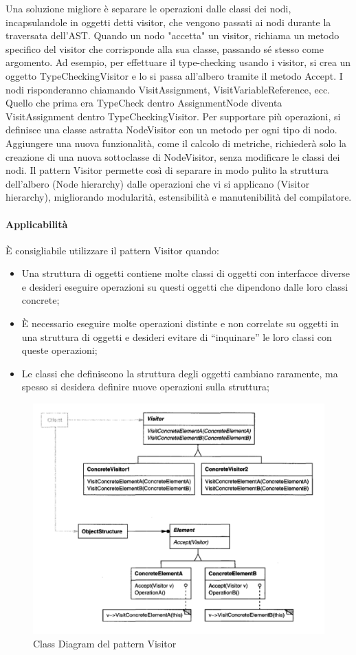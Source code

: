 Una soluzione migliore è separare le operazioni dalle classi dei nodi, incapsulandole in oggetti detti visitor, che vengono passati ai nodi durante la traversata dell’AST. Quando un nodo "accetta" un visitor, richiama un metodo specifico del visitor che corrisponde alla sua classe, passando sé stesso come argomento. Ad esempio, per effettuare il type-checking usando i visitor, si crea un oggetto TypeCheckingVisitor e lo si passa all’albero tramite il metodo Accept. I nodi risponderanno chiamando VisitAssignment, VisitVariableReference, ecc. Quello che prima era TypeCheck dentro AssignmentNode diventa VisitAssignment dentro TypeCheckingVisitor. Per supportare più operazioni, si definisce una classe astratta NodeVisitor con un metodo per ogni tipo di nodo. Aggiungere una nuova funzionalità, come il calcolo di metriche, richiederà solo la creazione di una nuova sottoclasse di NodeVisitor, senza modificare le classi dei nodi. Il pattern Visitor permette così di separare in modo pulito la struttura dell’albero (Node hierarchy) dalle operazioni che vi si applicano (Visitor hierarchy), migliorando modularità, estensibilità e manutenibilità del compilatore.

\paragraph{Applicabilità} È consigliabile utilizzare il pattern Visitor quando:
\begin{itemize}
    \item Una struttura di oggetti contiene molte classi di oggetti con interfacce diverse e desideri eseguire operazioni su questi oggetti che dipendono dalle loro classi concrete;
    \item È necessario eseguire molte operazioni distinte e non correlate su oggetti in una struttura di oggetti e desideri evitare di “inquinare” le loro classi con queste operazioni;
    \item Le classi che definiscono la struttura degli oggetti cambiano raramente, ma spesso si desidera definire nuove operazioni sulla struttura;
\end{itemize}

\begin{figure}[H]
    \centering
    \includegraphics[width=0.75\linewidth]{assets/pattern/visitor/visitor-struttura.png}
    \caption{Class Diagram del pattern Visitor}
\end{figure}

